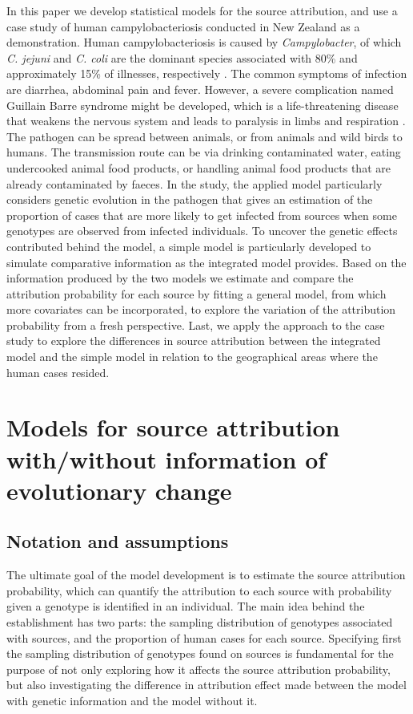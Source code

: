 \documentclass[times, doublespace]{WileyNJD-v2}%
\begin{document}
In this paper we develop statistical models for the source attribution, and use a case study of human campylobacteriosis conducted in New Zealand \cite{Marsh} as a demonstration. Human campylobacteriosis is caused by \textit{Campylobacter}, of which \textit{C. jejuni} and \textit{C. coli} are the dominant species associated with 80\% and approximately 15\% of illnesses, respectively \cite{Guert}. The common symptoms of infection are diarrhea, abdominal pain and fever. However, a severe complication named Guillain Barre syndrome might be developed, which is a life-threatening disease that weakens the nervous system and leads to paralysis in limbs and respiration \cite{Hanha}. The pathogen can be spread between animals, or from animals and wild birds to humans. The transmission route can be via drinking contaminated water, eating undercooked animal food products, or handling animal food products that are already contaminated by faeces. In the study, the applied model \cite{Wilso} particularly considers genetic evolution in the pathogen that gives an estimation of the proportion of cases that are more likely to get infected from sources when some genotypes are observed from infected individuals. To uncover the genetic effects contributed behind the model, a simple model is particularly developed to simulate comparative information as the integrated model provides. Based on the information produced by the two models we estimate and compare the attribution probability for each source by fitting a general model, from which more covariates can be incorporated, to explore the variation of the attribution probability from a fresh perspective. Last, we apply the approach to the case study to explore the differences in source attribution between the integrated model and the simple model in relation to the geographical areas where the human cases resided.


\section{Models for source attribution with/without information of evolutionary change}
\subsection{Notation and assumptions}
The ultimate goal of the model development is to estimate the source attribution probability, which can quantify the attribution to each source with probability given a genotype is identified in an individual. The main idea behind the establishment has two parts: the sampling distribution of genotypes associated with sources, and the proportion of human cases for each source. Specifying first the sampling distribution of genotypes found on sources is fundamental for the purpose of not only exploring how it affects the source attribution probability, but also investigating the difference in attribution effect made between the model with genetic information and the model without it. 
\end{document}
